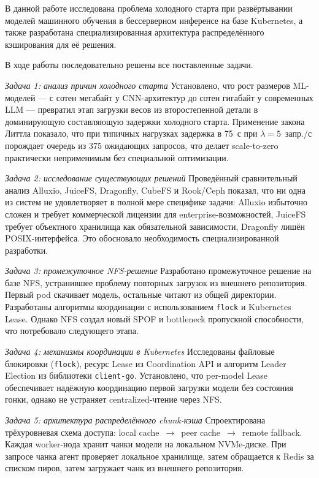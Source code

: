 \conclusion

В данной работе исследована проблема холодного старта при развёртывании моделей машинного обучения в бессерверном инференсе на базе Kubernetes, а также разработана специализированная архитектура распределённого кэширования для её решения.

 В ходе работы последовательно решены все поставленные задачи.

\textit{Задача 1: анализ причин холодного старта} Установлено, что рост размеров ML-моделей --- с сотен мегабайт у CNN-архитектур до сотен гигабайт у современных LLM --- превратил этап загрузки весов из второстепенной детали в доминирующую составляющую задержки холодного старта. Применение закона Литтла показало, что при типичных нагрузках задержка в 75~с при $\lambda = 5$~запр./с порождает очередь из 375 ожидающих запросов, что делает scale-to-zero практически неприменимым без специальной оптимизации.

\textit{Задача 2: исследование существующих решений} Проведённый сравнительный анализ Alluxio, JuiceFS, Dragonfly, CubeFS и Rook/Ceph показал, что ни одна из систем не удовлетворяет в полной мере специфике задачи: Alluxio избыточно сложен и требует коммерческой лицензии для enterprise-возможностей, JuiceFS требует объектного хранилища как обязательной зависимости, Dragonfly лишён POSIX-интерфейса. Это обосновало необходимость специализированной разработки.

\textit{Задача 3: промежуточное NFS-решение} Разработано промежуточное решение на базе NFS, устранившее проблему повторных загрузок из внешнего репозитория. Первый pod скачивает модель, остальные читают из общей директории. Разработаны алгоритмы координации с использованием \texttt{flock} и Kubernetes Lease. Однако NFS создал новый SPOF и bottleneck пропускной способности, что потребовало следующего этапа.

\textit{Задача 4: механизмы координации в Kubernetes} Исследованы файловые блокировки (\texttt{flock}), ресурс Lease из Coordination API и алгоритм Leader Election из библиотеки \texttt{client-go}. Установлено, что per-model Lease обеспечивает надёжную координацию первой загрузки модели без состояния гонки, однако не устраняет centralized-чтение через NFS.

\textit{Задача 5: архитектура распределённого chunk-кэша} Спроектирована трёхуровневая схема доступа: local cache~$\to$~peer cache~$\to$~remote fallback. Каждая worker-нода хранит чанки модели на локальном NVMe-диске. При запросе чанка агент проверяет локальное хранилище, затем обращается к Redis за списком пиров, затем загружает чанк из внешнего репозитория.

